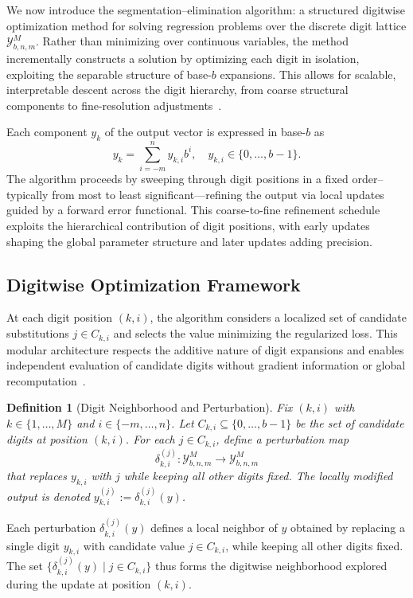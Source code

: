 \documentclass[aps,twocolumn,superscriptaddress,nofootinbib]{revtex4}
\newtheorem{definition}{Definition}
\begin{document}
We now introduce the segmentation–elimination algorithm: a structured digitwise optimization method for solving regression problems over the discrete digit lattice $\mathcal{Y}_{b,n,m}^M$. Rather than minimizing over continuous variables, the method incrementally constructs a solution by optimizing each digit in isolation, exploiting the separable structure of base-$b$ expansions. This allows for scalable, interpretable descent across the digit hierarchy, from coarse structural components to fine-resolution adjustments~\cite{ge2015escaping, mitarai2018parameter}.

Each component $y_k$ of the output vector is expressed in base-$b$ as
\begin{equation}
y_k = \sum_{i=-m}^{n} y_{k,i} b^i, \quad y_{k,i} \in \{0, \dots, b - 1\}.
\end{equation}
The algorithm proceeds by sweeping through digit positions in a fixed order--typically from most to least significant—refining the output via local updates guided by a forward error functional. This coarse-to-fine refinement schedule exploits the hierarchical contribution of digit positions, with early updates shaping the global parameter structure and later updates adding precision.
\subsection{Digitwise Optimization Framework}
At each digit position $(k,i)$, the algorithm considers a localized set of candidate substitutions $j \in C_{k,i}$ and selects the value minimizing the regularized loss. This modular architecture respects the additive nature of digit expansions and enables independent evaluation of candidate digits without gradient information or global recomputation~\cite{cerezo2021variational, schuld2019feature}.

\begin{definition}[Digit Neighborhood and Perturbation]
Fix $(k, i)$ with $k \in \{1, \dots, M\}$ and $i \in \{-m, \dots, n\}$. Let $C_{k,i} \subseteq \{0, \dots, b - 1\}$ be the set of candidate digits at position $(k, i)$. For each $j \in C_{k,i}$, define a perturbation map
\[
\delta_{k,i}^{(j)} : \mathcal{Y}_{b,n,m}^M \to \mathcal{Y}_{b,n,m}^M
\]
that replaces $y_{k,i}$ with $j$ while keeping all other digits fixed. The locally modified output is denoted $y_{k,i}^{(j)} := \delta_{k,i}^{(j)}(y)$.
\end{definition}

Each perturbation $\delta^{(j)}_{k,i}(y)$ defines a local neighbor of $y$ obtained by replacing a single digit $y_{k,i}$ with candidate value $j \in C_{k,i}$, while keeping all other digits fixed. The set $\{\delta^{(j)}_{k,i}(y) \mid j \in C_{k,i}\}$ thus forms the digitwise neighborhood explored during the update at position $(k,i)$.
\end{document}
